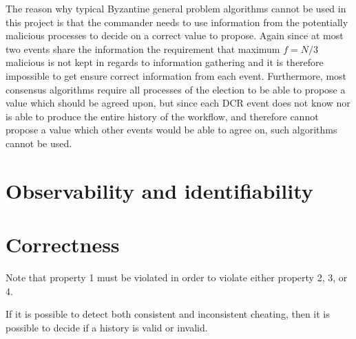     The reason why typical Byzantine general problem algorithms cannot be used in this project is that the commander needs to use information from the potentially malicious processes to decide on a correct value to propose. Again since at most two events share the information the requirement that maximum $f=N/3$ malicious is not kept in regards to information gathering and it is therefore impossible to get ensure correct information from each event.
    Furthermore, most consensus algorithms require all processes of the election to be able to propose a value which should be agreed upon, but since each DCR event does not know nor is able to produce the entire history of the workflow, and therefore cannot propose a value which other events would be able to agree on, such algorithms cannot be used.
    
    \section{Observability and identifiability}
    
    \section{Correctness}
    Note that property 1 must be violated in order to violate either property 2, 3, or 4. 
    
    If it is possible to detect both consistent and inconsistent cheating, then it is possible to decide if a history is valid or invalid.